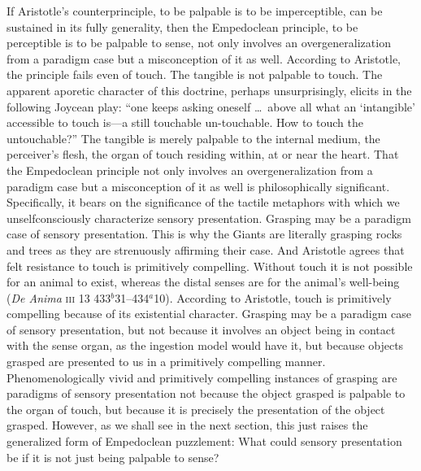 If Aristotle's counterprinciple, to be palpable is to be imperceptible, can be sustained in its fully generality, then the Empedoclean principle, to be perceptible is to be palpable to sense, not only involves an overgeneralization from a paradigm case but a misconception of it as well. According to Aristotle, the principle fails even of touch. The tangible is not palpable to touch. The apparent aporetic character of this doctrine, perhaps unsurprisingly, elicits in \citet[6]{Derrida:2005aa} the following Joycean play: ``one keeps asking oneself \ldots\ above all what an `intangible' accessible to touch is---a still touchable un-touchable. How to touch the untouchable?'' The tangible is merely palpable to the internal medium, the perceiver's flesh, the organ of touch residing within, at or near the heart. That the Empedoclean principle not only involves an overgeneralization from a paradigm case but a misconception of it as well is philosophically significant. Specifically, it bears on the significance of the tactile metaphors with which we unselfconsciously characterize sensory presentation. Grasping may be a paradigm case of sensory presentation. This is why the Giants are literally grasping rocks and trees as they are strenuously affirming their case. And Aristotle agrees that felt resistance to touch is primitively compelling. Without touch it is not possible for an animal to exist, whereas the distal senses are for the animal's well-being (\emph{De Anima} \textsc{iii} 13 433\( ^{b} \)31--434\( ^{a} \)10). According to Aristotle, touch is primitively compelling because of its existential character. Grasping may be a paradigm case of sensory presentation, but not because it involves an object being in contact with the sense organ, as the ingestion model would have it, but because objects grasped are presented to us in a primitively compelling manner. Phenomenologically vivid and primitively compelling instances of grasping are paradigms of sensory presentation not because the object grasped is palpable to the organ of touch, but because it is precisely the presentation of the object grasped. However, as we shall see in the next section, this just raises the generalized form of Empedoclean puzzlement: What could sensory presentation be if it is not just being palpable to sense?

